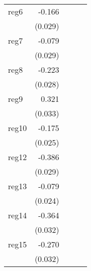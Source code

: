 {\begin{longtable}{l*{4}{D{.}{.}{-1}}}
\addlinespace
reg6        &      -0.166\sym{***}&                     &                     &                     \\
            &     (0.029)         &                     &                     &                     \\
\addlinespace
reg7        &      -0.079\sym{**} &                     &                     &                     \\
            &     (0.029)         &                     &                     &                     \\
\addlinespace
reg8        &      -0.223\sym{***}&                     &                     &                     \\
            &     (0.028)         &                     &                     &                     \\
\addlinespace
reg9        &       0.321\sym{***}&                     &                     &                     \\
            &     (0.033)         &                     &                     &                     \\
\addlinespace
reg10       &      -0.175\sym{***}&                     &                     &                     \\
            &     (0.025)         &                     &                     &                     \\
\addlinespace
reg12       &      -0.386\sym{***}&                     &                     &                     \\
            &     (0.029)         &                     &                     &                     \\
\addlinespace
reg13       &      -0.079\sym{***}&                     &                     &                     \\
            &     (0.024)         &                     &                     &                     \\
\addlinespace
reg14       &      -0.364\sym{***}&                     &                     &                     \\
            &     (0.032)         &                     &                     &                     \\
\addlinespace
reg15       &      -0.270\sym{***}&                     &                     &                     \\
            &     (0.032)         &                     &                     &                     \\

\end{longtable}}
